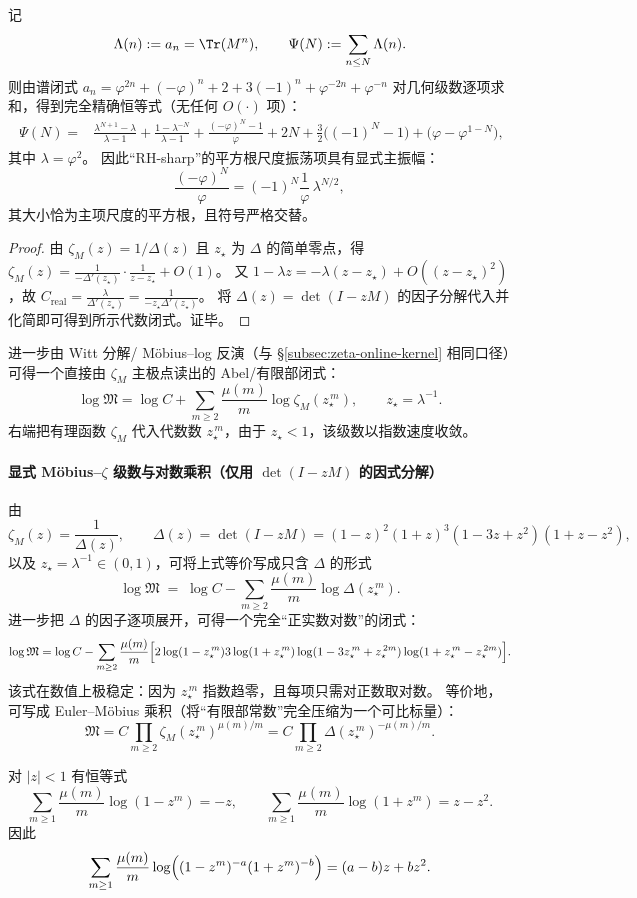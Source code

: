 \begin{corollary}\label{cor:real-input-40-chebyshev-explicit}
记
\[
\Lambda(n):=a_n=\Tr(M^n),
\qquad
\Psi(N):=\sum_{n\le N}\Lambda(n).
\]
则由谱闭式
\(
a_n=\varphi^{2n}+(-\varphi)^n+2+3(-1)^n+\varphi^{-2n}+\varphi^{-n}
\)
对几何级数逐项求和，得到完全精确恒等式（无任何 \(O(\cdot)\) 项）：
\[
\boxed{\;
\begin{aligned}
\Psi(N)
={}&\frac{\lambda^{N+1}-\lambda}{\lambda-1}
+\frac{1-\lambda^{-N}}{\lambda-1}
+\frac{(-\varphi)^N-1}{\varphi}
+2N+\frac{3}{2}\bigl((-1)^N-1\bigr)
+\bigl(\varphi-\varphi^{1-N}\bigr),
\end{aligned}}
\]
其中 \(\lambda=\varphi^2\)。
因此“RH-sharp”的平方根尺度振荡项具有显式主振幅：
\[
\frac{(-\varphi)^N}{\varphi}=(-1)^N\frac{1}{\varphi}\,\lambda^{N/2},
\]
其大小恰为主项尺度的平方根，且符号严格交替。
\end{corollary}
\begin{proof}
由 \(\zeta_M(z)=1/\Delta(z)\) 且 \(z_\star\) 为 \(\Delta\) 的简单零点，得
\(
\zeta_M(z)=\frac{1}{-\Delta'(z_\star)}\cdot\frac{1}{z-z_\star}+O(1)
\)。
又 \(1-\lambda z=-\lambda(z-z_\star)+O((z-z_\star)^2)\)，故
\(
C_{\mathrm{real}}=\frac{\lambda}{\Delta'(z_\star)}=\frac{1}{-z_\star\Delta'(z_\star)}
\)。
将 \(\Delta(z)=\det(I-zM)\) 的因子分解代入并化简即可得到所示代数闭式。证毕。
\end{proof}
进一步由 Witt 分解/ Möbius--log 反演（与 \S\ref{subsec:zeta-online-kernel} 相同口径）可得一个直接由 $\zeta_M$ 主极点读出的 Abel/有限部闭式：
\[
\log\mathfrak{M}
=\log C+\sum_{m\ge 2}\frac{\mu(m)}{m}\log\zeta_M(z_\star^{\,m}),
\qquad z_\star=\lambda^{-1}.
\]
右端把有理函数 $\zeta_M$ 代入代数数 $z_\star^{\,m}$，由于 $z_\star<1$，该级数以指数速度收敛。

\paragraph{显式 Möbius--$\zeta$ 级数与对数乘积（仅用 \texorpdfstring{$\det(I-zM)$}{det} 的因式分解）}
由
\[
\zeta_M(z)=\frac{1}{\Delta(z)},\qquad
\Delta(z)=\det(I-zM)=(1-z)^2(1+z)^3(1-3z+z^2)(1+z-z^2),
\]
以及 $z_\star=\lambda^{-1}\in(0,1)$，可将上式等价写成只含 $\Delta$ 的形式
\[
\log\mathfrak{M}
\;=\;
\log C-\sum_{m\ge 2}\frac{\mu(m)}{m}\log \Delta(z_\star^{\,m}).
\]
进一步把 $\Delta$ 的因子逐项展开，可得一个完全“正实数对数”的闭式：
\[
\log\mathfrak{M}
=\log C
-\sum_{m\ge 2}\frac{\mu(m)}{m}\Bigl[
2\log(1-z_\star^{\,m})
3\log(1+z_\star^{\,m})
\log(1-3z_\star^{\,m}+z_\star^{\,2m})
\log(1+z_\star^{\,m}-z_\star^{\,2m})
\Bigr].
\]
该式在数值上极稳定：因为 $z_\star^{\,m}$ 指数趋零，且每项只需对正数取对数。
等价地，可写成 Euler--Möbius 乘积（将“有限部常数”完全压缩为一个可比标量）：
\[
\mathfrak{M}
=C\prod_{m\ge 2}\zeta_M(z_\star^{\,m})^{\mu(m)/m}
=C\prod_{m\ge 2}\Delta(z_\star^{\,m})^{-\mu(m)/m}.
\]
\begin{lemma}\label{lem:mobius-collapse}
对 $|z|<1$ 有恒等式
\[
\sum_{m\ge 1}\frac{\mu(m)}{m}\log(1-z^m)=-z,\qquad
\sum_{m\ge 1}\frac{\mu(m)}{m}\log(1+z^m)=z-z^2.
\]
因此
\[
\sum_{m\ge 1}\frac{\mu(m)}{m}\log\Bigl((1-z^m)^{-a}(1+z^m)^{-b}\Bigr)=(a-b)z+bz^2.
\]
\end{lemma}

